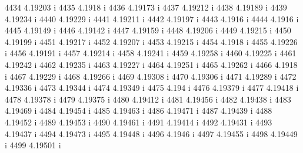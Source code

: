  4434  4.19203  i
 4435  4.1918  i
 4436  4.19173  i
 4437  4.19212  i
 4438  4.19189  i
 4439  4.19234  i
 4440  4.19229  i
 4441  4.19211  i
 4442  4.19197  i
 4443  4.1916  i
 4444  4.1916  i
 4445  4.19149  i
 4446  4.19142  i
 4447  4.19159  i
 4448  4.19206  i
 4449  4.19215  i
 4450  4.19199  i
 4451  4.19217  i
 4452  4.19207  i
 4453  4.19215  i
 4454  4.1918  i
 4455  4.19226  i
 4456  4.19191  i
 4457  4.19214  i
 4458  4.19241  i
 4459  4.19258  i
 4460  4.19225  i
 4461  4.19242  i
 4462  4.19235  i
 4463  4.19227  i
 4464  4.19251  i
 4465  4.19262  i
 4466  4.1918  i
 4467  4.19229  i
 4468  4.19266  i
 4469  4.19308  i
 4470  4.19306  i
 4471  4.19289  i
 4472  4.19336  i
 4473  4.19344  i
 4474  4.19349  i
 4475  4.194  i
 4476  4.19379  i
 4477  4.19418  i
 4478  4.19378  i
 4479  4.19375  i
 4480  4.19412  i
 4481  4.19456  i
 4482  4.19438  i
 4483  4.19469  i
 4484  4.19454  i
 4485  4.19463  i
 4486  4.19471  i
 4487  4.19439  i
 4488  4.19452  i
 4489  4.19453  i
 4490  4.19461  i
 4491  4.19414  i
 4492  4.19431  i
 4493  4.19437  i
 4494  4.19473  i
 4495  4.19448  i
 4496  4.1946  i
 4497  4.19455  i
 4498  4.19449  i
 4499  4.19501  i

